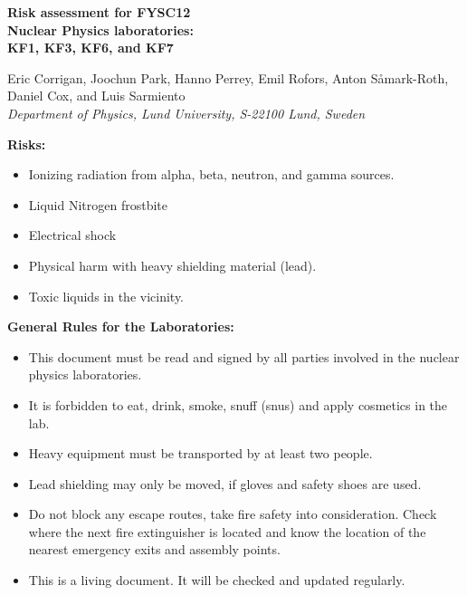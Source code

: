 \documentclass[11pt]{article}
\begin{document}
\begin{center}

  {\Large\bf\boldmath Risk assessment for FYSC12\\ Nuclear Physics
    laboratories:}\\[1mm] {\large\bf\boldmath \textsc{KF1}, \textsc{KF3},
    \textsc{KF6}, and \textsc{KF7}}\\
  \vspace*{4mm}

  {\footnotesize Eric Corrigan, Joochun Park, Hanno Perrey, Emil
    Rofors, Anton S{\aa}mark-Roth, Daniel Cox, and Luis
    Sarmiento}\\
  {\small\it Department of Physics, Lund University,
    S-22100 Lund, Sweden}\\

\end{center}

{\bf Risks:}
\begin{itemize}
\item Ionizing radiation from alpha, beta, neutron, and gamma sources.
\item Liquid Nitrogen frostbite
\item Electrical shock
\item Physical harm with heavy shielding material (lead).
\item Toxic liquids in the vicinity.
\end{itemize}

{\bf General Rules for the Laboratories:}
\begin{itemize}
\item This document must be read and signed by all parties involved in
  the nuclear physics laboratories.
\item It is forbidden to eat, drink, smoke, snuff (snus) and apply
  cosmetics in the lab.
\item Heavy equipment must be transported by at least two people.
\item Lead shielding may only be moved, if gloves and safety shoes are
  used.
\item Do not block any escape routes, take fire safety into
  consideration. Check where the next fire extinguisher is located and
  know the location of the nearest emergency exits and assembly
  points.
\item This is a living document. It will be checked and updated
  regularly.
\end{itemize}
\end{document}
